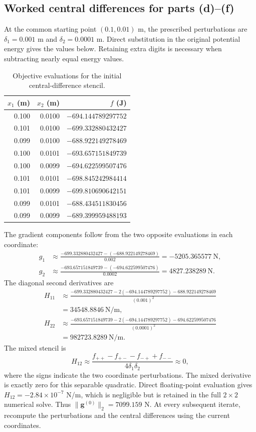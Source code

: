 \clearpage
\subsection{Worked central differences for parts (d)--(f)}
At the common starting point $(0.1,0.01)$ m, the prescribed perturbations are
$\delta_1=0.001$ m and $\delta_2=0.0001$ m. Direct substitution in the
original potential energy gives the values below. Retaining extra digits
is necessary when subtracting nearly equal energy values.
\begin{table}[H]
\centering
\caption{Objective evaluations for the initial central-difference stencil.}
\begin{tabular}{rrr}
\toprule
$x_1$ (m)&$x_2$ (m)&$f$ (J)\\
\midrule
0.100&0.0100&$-694.144789297752$\\
0.101&0.0100&$-699.332880432427$\\
0.099&0.0100&$-688.922149278469$\\
0.100&0.0101&$-693.657151849739$\\
0.100&0.0099&$-694.622599507476$\\
0.101&0.0101&$-698.845242984414$\\
0.101&0.0099&$-699.810690642151$\\
0.099&0.0101&$-688.434511830456$\\
0.099&0.0099&$-689.399959488193$\\
\bottomrule
\end{tabular}
\end{table}
The gradient components follow from the two opposite evaluations in
each coordinate:
\begin{align*}
g_1&\approx\frac{-699.332880432427-(-688.922149278469)}{0.002}
=-5205.365577\ \mathrm N,\\
g_2&\approx\frac{-693.657151849739-(-694.622599507476)}{0.0002}
=4827.238289\ \mathrm N.
\end{align*}
The diagonal second derivatives are
\begin{align*}
H_{11}&\approx
\frac{-699.332880432427-2(-694.144789297752)-688.922149278469}{(0.001)^2}\\
&=34548.8846\ \mathrm{N/m},\\
H_{22}&\approx
\frac{-693.657151849739-2(-694.144789297752)-694.622599507476}{(0.0001)^2}\\
&=982723.8289\ \mathrm{N/m}.
\end{align*}
The mixed stencil is
\[
H_{12}\approx
\frac{f_{++}-f_{+-}-f_{-+}+f_{--}}{4\delta_1\delta_2}\approx0,
\]
where the signs indicate the two coordinate perturbations. The mixed
derivative is exactly zero for this separable quadratic. Direct floating-point
evaluation gives $H_{12}=-2.84\times10^{-7}$ N/m, which is negligible but is
retained in the full $2\times2$ numerical solve. Thus
$\|\bm g^{(0)}\|_2=7099.159$ N. At every subsequent iterate, recompute the
perturbations and the central differences using the current coordinates.

